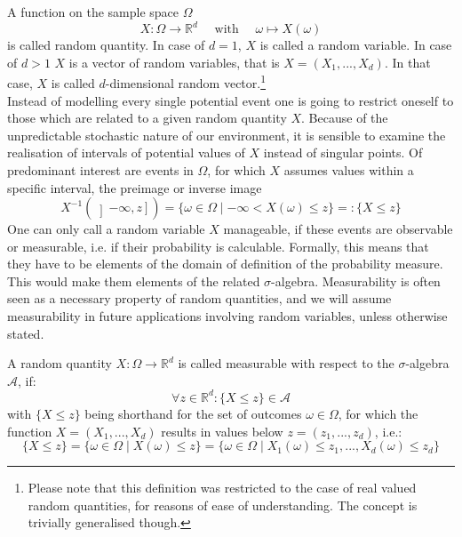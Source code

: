 \documentclass[12pt]{article}
\begin{document}
A function on the sample space $\Omega$ \[
X : \Omega \to \mathbb{R}^d \quad \text{  with  }\quad \omega \mapsto X(\omega)
\]
is called random quantity. In case of $d=1$, $X$ is called a random variable. In case of
$d>1$ $X$ is a vector of random variables, that is $X = (X_1, . . . , X_d)$. In that case, $X$ is called $d$-dimensional random vector.\footnote{Please note that this definition was restricted to the case of real valued random quantities, for reasons of ease of understanding. The concept is trivially generalised though.}
\\
Instead of modelling every single potential event one is going to restrict oneself to those which are related to a given random quantity $X$. Because of the unpredictable stochastic nature of our environment, it is sensible to examine the realisation of intervals of potential values of $X$ instead of singular points. Of predominant  interest are events in $\Omega$, for which $X$ assumes values within a specific interval, the preimage or inverse image \[
X^{-1}(\left] -\infty, z \right] ) = \{ \omega \in \Omega \mid -\infty < X(\omega) \leq z \} =: \{ X \leq z \}
\]
One can only call a random variable $X$ \glqq manageable\grqq, if these events are observable or \glqq measurable\grqq, i.e. if their probability is calculable.
Formally, this means that they have to be elements of the domain of definition of the probability measure.
This would make them elements of the related $\sigma$-algebra. Measurability is often seen as a necessary property of random quantities,
and we will assume measurability in future applications involving random variables, unless otherwise stated.

A random quantity $X : \Omega \to \mathbb{R}^d $ is called measurable with respect to the $\sigma$-algebra $\mathscr{A}$, if:
\[
\forall z \in \mathbb{R}^d : \{X \leq z\} \in \mathscr{A}
\]
with $\{X \leq z\}$ being shorthand for the set of outcomes $\omega \in \Omega$, for which the function $X = (X_1, . . . , X_d)$ results in values below $z = (z_1, . . . , z_d)$, i.e.:
\[
\{X \leq z\} = \{\omega \in \Omega \mid X(\omega) \leq z\} = \{\omega \in \Omega \mid X_1(\omega)\leq z_1, ..., X_d(\omega)\leq z_d\}
\]
\end{document}
